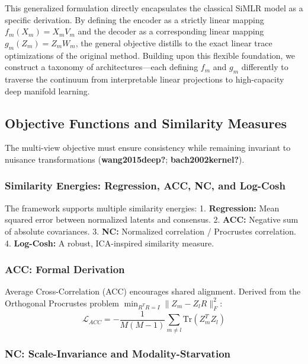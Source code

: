\documentclass[
  letterpaper,
]{report}
\begin{document}
This generalized formulation directly encapsulates the classical SiMLR
model as a specific derivation. By defining the encoder as a strictly
linear mapping \(f_m(X_m) = X_m V_m\) and the decoder as a corresponding
linear mapping \(g_m(Z_m) = Z_m W_m\), the general objective distills to
the exact linear trace optimizations of the original method. Building
upon this flexible foundation, we construct a taxonomy of
architectures---each defining \(f_m\) and \(g_m\) differently to
traverse the continuum from interpretable linear projections to
high-capacity deep manifold learning.

\subsection{Objective Functions and Similarity
Measures}\label{objective-functions-and-similarity-measures}

The multi-view objective must ensure consistency while remaining
invariant to nuisance transformations (\textbf{wang2015deep?};
\textbf{bach2002kernel?}).

\subsubsection{Similarity Energies: Regression, ACC, NC, and
Log-Cosh}\label{similarity-energies-regression-acc-nc-and-log-cosh}

The framework supports multiple similarity energies: 1.
\textbf{Regression:} Mean squared error between normalized latents and
consensus. 2. \textbf{ACC:} Negative sum of absolute covariances. 3.
\textbf{NC:} Normalized correlation / Procrustes correlation. 4.
\textbf{Log-Cosh:} A robust, ICA-inspired similarity measure.

\subsubsection{ACC: Formal Derivation}\label{acc-formal-derivation}

Average Cross-Correlation (ACC) encourages shared alignment. Derived
from the Orthogonal Procrustes problem
\(\min_{R^T R = I} \| Z_m - Z_l R \|_F^2\):
\[ \mathcal{L}_{ACC} = - \frac{1}{M(M-1)} \sum_{m \neq l} \text{Tr}(Z_m^T Z_l) \]

\subsubsection{NC: Scale-Invariance and
Modality-Starvation}\label{nc-scale-invariance-and-modality-starvation}
\end{document}
